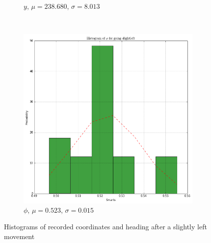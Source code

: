 \documentclass[paper=a4, fontsize=11pt]{scrartcl} %
\begin{document}
\begin{figure}[h!]
\begin{subfigure}[b]{0.3\textwidth}
            \caption{$y$, $\mu = 238.680$, $\sigma = 8.013$}
        \end{subfigure}
        ~
        \begin{subfigure}[b]{0.3\textwidth}
            \setlength{\fboxsep}{0.5pt} %
            \setlength{\fboxrule}{0.5pt}
            \includegraphics[width=\textwidth,fbox]{images/histogram_2_phi_slightLeft.png}
            \caption{$\phi$, $\mu = 0.523$, $\sigma = 0.015$}
        \end{subfigure}
        \caption{Histograms of recorded coordinates and heading after a slightly left movement}
    \end{figure}

    \newpage
\end{document}
